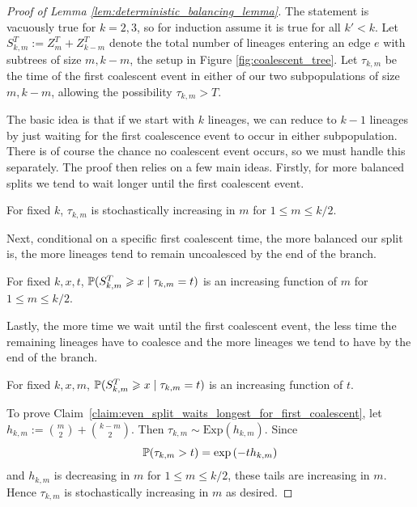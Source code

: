 \begin{proof}[Proof of Lemma \ref{lem:deterministic_balancing_lemma}]
The statement is vacuously true for $k=2,3$, so for induction assume it is true for all $k' < k$. Let $S_{k,m}^T := Z_m^T + Z^T_{k-m}$ denote the total number of lineages entering an edge $e$ with subtrees of size $m,k-m$, the setup in Figure \ref{fig:coalescent_tree}. Let $\tau_{k,m}$ be the time of the first coalescent event in either of our two subpopulations of size $m,k-m$, allowing the possibility $\tau_{k,m} > T$.

The basic idea is that if we start with $k$ lineages, we can reduce to $k-1$ lineages by just waiting for the first coalescence event to occur in either subpopulation. There is of course the chance no coalescent event occurs, so we must handle this separately. The proof then relies on a few main ideas. Firstly, for more balanced splits we tend to wait longer until the first coalescent event.
\begin{proofclaim}
\label{claim:even_split_waits_longest_for_first_coalescent}
For fixed $k$, $\tau_{k,m}$ is stochastically increasing in $m$ for $1 \leq m \leq k/2$.
\end{proofclaim}

\noindent Next, conditional on a specific first coalescent time, the more balanced our split is, the more lineages tend to remain uncoalesced by the end of the branch.
\begin{proofclaim}
\label{claim:cond_first_coalescent_even_split_dominates}
For fixed $k, x,t$, $\P(S_{k,m}^T \geq x \; | \; \tau_{k,m} = t)$ is an increasing function of $m$ for $1 \leq m \leq k/2$.
\end{proofclaim}

\noindent Lastly, the more time we wait until the first coalescent event, the less time the remaining lineages have to coalesce and the more lineages we tend to have by the end of the branch.
\begin{proofclaim}
\label{claim:more_time_to_coalesce_is_better}
For fixed $k, x, m$, $\P(S_{k,m}^T \geq x \; | \; \tau_{k,m} = t)$ is an increasing function of $t$.
\end{proofclaim}

\noindent To prove Claim~\ref{claim:even_split_waits_longest_for_first_coalescent}, let $h_{k,m} := \binom{m}{2} + \binom{k-m}{2}$.
Then $\tau_{k,m} \sim \mathrm{Exp}\left(h_{k,m}\right)$. Since
\[
\P(\tau_{k,m} > t) = \exp\left(-th_{k,m}\right)
\]
and $h_{k,m}$ is decreasing in $m$ for $1 \leq m \leq k/2$, these tails are increasing
in $m$. Hence $\tau_{k,m}$ is stochastically increasing in $m$ as desired.



\end{proof}
